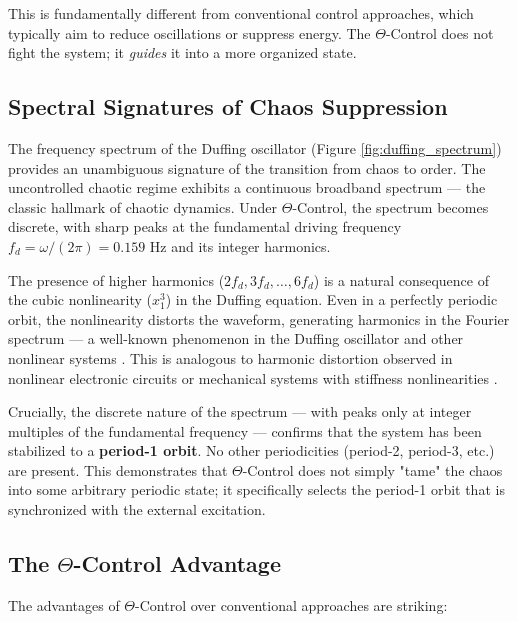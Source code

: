 \documentclass[12pt,a4paper]{article}
\begin{document}
This is fundamentally different from conventional control 
approaches, which typically aim to reduce oscillations or suppress 
energy. The $\Theta$-Control does not fight the system; it 
\emph{guides} it into a more organized state.

\subsection{Spectral Signatures of Chaos Suppression}

The frequency spectrum of the Duffing oscillator (Figure 
\ref{fig:duffing_spectrum}) provides an unambiguous signature of 
the transition from chaos to order. The uncontrolled chaotic regime 
exhibits a continuous broadband spectrum — the classic hallmark of 
chaotic dynamics. Under $\Theta$-Control, the spectrum becomes 
discrete, with sharp peaks at the fundamental driving frequency 
$f_d = \omega/(2\pi) = 0.159$ Hz and its integer harmonics.

The presence of higher harmonics ($2f_d, 3f_d, \ldots, 6f_d$) is a 
natural consequence of the cubic nonlinearity ($x_1^3$) in the 
Duffing equation. Even in a perfectly periodic orbit, the 
nonlinearity distorts the waveform, generating harmonics in the 
Fourier spectrum — a well-known phenomenon in the Duffing 
oscillator and other nonlinear systems \citep{Kovacic2011, 
Guckenheimer1983}. This is analogous to harmonic distortion 
observed in nonlinear electronic circuits or mechanical systems 
with stiffness nonlinearities \citep{Schoukens2005, Nayfeh2008}.

Crucially, the discrete nature of the spectrum — with peaks only at 
integer multiples of the fundamental frequency — confirms that the 
system has been stabilized to a \textbf{period-1 orbit}. No other 
periodicities (period-2, period-3, etc.) are present. This 
demonstrates that $\Theta$-Control does not simply "tame" the chaos 
into some arbitrary periodic state; it specifically selects the 
period-1 orbit that is synchronized with the external excitation.

\subsection{The $\Theta$-Control Advantage}

The advantages of $\Theta$-Control over conventional approaches 
are striking:
\end{document}
